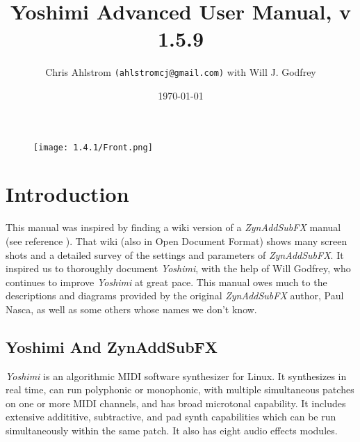 \documentclass[
 11pt,
 twoside,
 a4paper,
 final                                 %
]{article}
\begin{document}
\title{Yoshimi Advanced User Manual, v 1.5.9}
\author{Chris Ahlstrom \texttt{(ahlstromcj@gmail.com)} with Will J. Godfrey}
\date{\today}
\maketitle

\begin{figure}[H]
   \centering
   \texttt{[image: 1.4.1/Front.png]}
\end{figure}

\clearpage                             %

\tableofcontents
\listoffigures                         %
\listoftables                          %

%

\setlength{\parindent}{2em}
\setlength{\parskip}{1ex plus 0.5ex minus 0.2ex}

\section{Introduction}
\label{sec:introduction}

   This manual was inspired by finding a wiki version of a
   \textsl{ZynAddSubFX} manual (see reference \cite{zynwiki}).  That wiki
   (also in Open Document Format) shows many screen shots and a
   detailed survey of the settings and parameters of \textsl{ZynAddSubFX}.  It
   inspired us to thoroughly document \textsl{Yoshimi}, with the help of
   Will Godfrey, who continues to improve \textsl{Yoshimi} at great pace.
   This manual owes much to the descriptions and diagrams provided by the
   original \textsl{ZynAddSubFX} author, Paul Nasca, as well as some others
   whose names we don't know.

\subsection{Yoshimi And ZynAddSubFX}
\label{subsec:introduction_yoshimi_vs_zyn}

   \textsl{Yoshimi} is an algorithmic MIDI software synthesizer for Linux.
   It synthesizes in real time, can run polyphonic or monophonic, with multiple
   simultaneous patches on one or more MIDI channels, and has broad microtonal
   capability. It includes extensive addititive, subtractive,
   and pad synth capabilities which can be run simultaneously within the
   same patch.  It also has eight audio effects modules.
\end{document}
